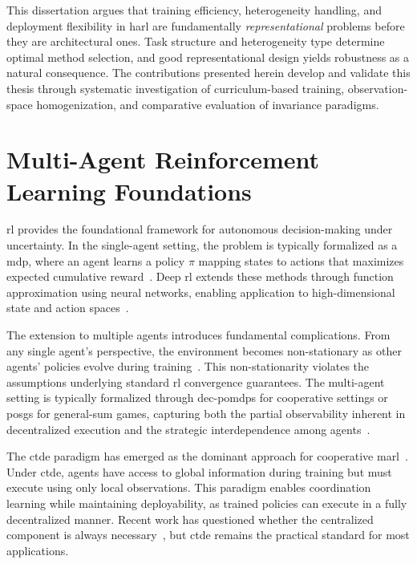 This dissertation argues that training efficiency, heterogeneity handling, 
and deployment flexibility in \gls{harl} are fundamentally \emph{representational} 
problems before they are architectural ones. Task structure and heterogeneity 
type determine optimal method selection, and good representational 
design yields robustness as a natural consequence. 
The contributions presented herein develop and validate this thesis 
through systematic investigation of curriculum-based training, 
observation-space homogenization, and comparative evaluation of invariance paradigms.


\section{Multi-Agent Reinforcement Learning Foundations}%
\label{sec:intro_marl}

\Gls{rl} provides the foundational framework for autonomous decision-making under uncertainty. 
In the single-agent setting, the problem is typically formalized as a \gls{mdp}, 
where an agent learns a policy $\pi$ mapping states to actions that maximizes 
expected cumulative reward~\cite{sutton2018}. 
Deep \gls{rl} extends these methods through function approximation 
using neural networks, enabling application to high-dimensional 
state and action spaces~\cite{mnih2015}.

The extension to multiple agents introduces fundamental complications. 
From any single agent's perspective, the environment becomes 
non-stationary as other agents' policies evolve during training~\cite{busoniu2008}. 
This non-stationarity violates the assumptions underlying standard 
\gls{rl} convergence guarantees. The multi-agent setting is typically 
formalized through \glspl{dec-pomdp} for cooperative settings or \glspl{posg} 
for general-sum games, capturing both the partial observability inherent in 
decentralized execution and the strategic interdependence among 
agents~\cite{littman1994,shoham2007}.

The \gls{ctde} paradigm has emerged as the dominant approach for 
cooperative \gls{marl}~\cite{lowe2020,foerster2018,rashid2018}. 
Under \gls{ctde}, agents have access to global information during 
training but must execute using only local observations. 
This paradigm enables coordination learning while maintaining deployability, 
as trained policies can execute in a fully decentralized manner. 
Recent work has questioned whether the centralized component 
is always necessary~\cite{zhou2023}, but \gls{ctde} remains the 
practical standard for most applications.

